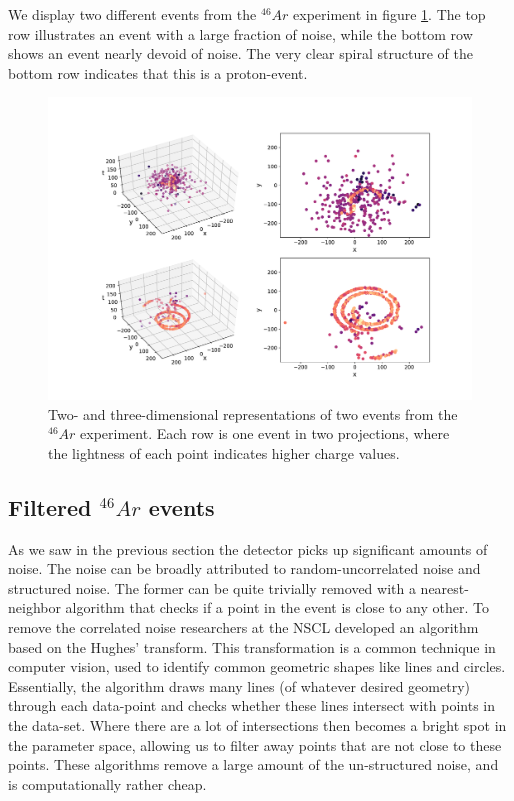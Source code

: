 We display two different events from the ${}^{46}Ar$ experiment in figure \ref{fig:samples}. The top row illustrates an event with a large fraction of noise, while the bottom row shows an event nearly devoid of noise. The very clear spiral structure of the bottom row indicates that this is a proton-event.

\begin{figure}[H]
\centering
\includegraphics[width=\textwidth]{../plots/display_eventsfull_.pdf}
\caption[Displaying un-filtered events in 2D and 3D]{Two- and three-dimensional representations of two events from the ${}^{46}Ar$ experiment. Each row is one event in two projections, where the lightness of each point indicates higher charge values.}\label{fig:samples}
\end{figure}

\subsection{Filtered \texorpdfstring{${}^{46}Ar$}{46Ar} events}\label{sec:filtered}

As we saw in the previous section the detector picks up significant amounts of noise. The noise can be broadly attributed to random-uncorrelated noise and structured noise. The former can be quite trivially removed with a nearest-neighbor algorithm that checks if a point in the event is close to any other. To remove the correlated noise researchers at the NSCL developed an algorithm based on the Hughes' transform. This transformation is a common technique in computer vision, used to identify common geometric shapes like lines and circles. Essentially, the algorithm draws many lines (of whatever desired geometry) through each data-point and checks whether these lines intersect with points in the data-set. Where there are a lot of intersections then becomes a bright spot in the parameter space, allowing us to filter away points that are not close to these points. These algorithms remove a large amount of the un-structured noise, and is computationally rather cheap.

